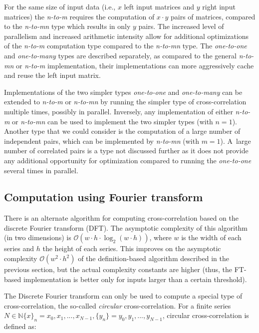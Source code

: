 For the same size of input data (i.e., $x$ left input matrices and $y$ right input matrices) the \textit{n-to-m} requires the computation of $x \cdot y$ pairs of matrices, compared to the \textit{n-to-mn} type which results in only $y$ pairs. The increased level of parallelism and increased arithmetic intensity allow for additional optimizations of the \textit{n-to-m} computation type compared to the \textit{n-to-mn} type. The \textit{one-to-one} and \textit{one-to-many} types are described separately, as compared to the general \textit{n-to-mn} or \textit{n-to-m} implementation, their implementations can more aggressively cache and reuse the left input matrix. 

Implementations of the two simpler types \textit{one-to-one} and \textit{one-to-many} can be extended to \textit{n-to-m} or \textit{n-to-mn} by running the simpler type of cross-correlation multiple times, possibly in parallel. Inversely, any implementation of either \textit{n-to-m} or \textit{n-to-mn} can be used to implement the two simpler types (with $n=1$). Another type that we could consider is the computation of a large number of independent pairs, which can be implemented by \textit{n-to-mn} (with $m=1$). A~large number of correlated pairs is a type not discussed further as it does not provide any additional opportunity for optimization compared to running the \textit{one-to-one} several times in parallel.



\subsection{Computation using Fourier transform}\label{sec:cross_corr_fft}

There is an alternate algorithm for computing cross-correlation based on the discrete Fourier transform (DFT). The asymptotic complexity of this algorithm (in two dimensions) is $\mathcal{O}(w \cdot h \cdot \log_2(w \cdot h))$, where $w$ is the width of each series and $h$ the height of each series. This improves on the asymptotic complexity $\mathcal{O}(w^2 \cdot h^2)$ of the definition-based algorithm described in the previous section, but the actual complexity constants are higher (thus, the FT-based implementation is better only for inputs larger than a certain threshold).

The Discrete Fourier transform can only be used to compute a special type of cross-correlation, the so-called \textit{circular} cross-correlation.
For a finite series $N \in \mathbb{N} \{x\}_n = x_0, x_1, ..., x_{N-1}, \{y_n\} = y_0, y_1, ..., y_{N-1}$, circular cross-correlation is defined as:

